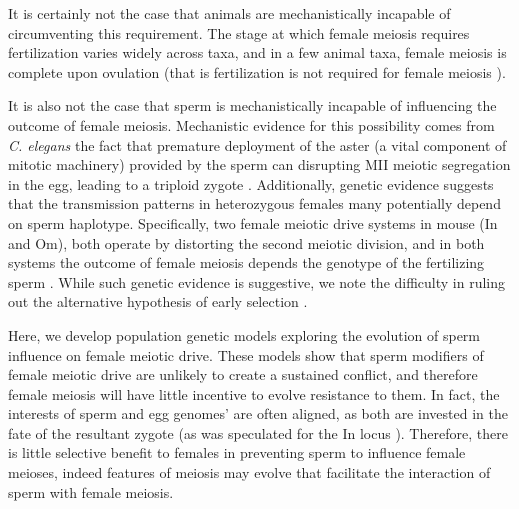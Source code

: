 \documentclass[12pt,letterpaper]{article}
\newcommand{\gc}[1]{{ \color{red} #1}}
\begin{document}
It is certainly not the case that animals are mechanistically incapable of circumventing this requirement.
The stage at which female meiosis requires fertilization varies widely across taxa, and in a few animal taxa, 
	female meiosis is complete upon ovulation (that is fertilization is not required for female meiosis \citep[see
	Table 1 of ][]{Masui_book}). 

It is also not the case that sperm is mechanistically incapable of influencing the outcome of female meiosis.
Mechanistic evidence for this possibility comes from
\emph{C. elegans} the fact that premature deployment of the aster (a vital component of mitotic
machinery) provided by the sperm can disrupting MII meiotic segregation
in the egg, leading to a triploid zygote \citep{McNally2012}. 
Additionally, genetic evidence suggests that the transmission patterns
in heterozygous females many potentially depend on sperm haplotype. 
Specifically, two female meiotic drive systems in mouse (In and Om), both operate by distorting the second meiotic division, 
and in both systems the outcome of female meiosis depends the genotype of the fertilizing sperm \citep{Agulnik1993,Wu2005}. 
While such genetic evidence is suggestive, we note the difficulty in
ruling out the alternative hypothesis of early selection  \citep[pages
52-54][]{Burt2006}.



Here, we develop population genetic models exploring the evolution of sperm influence on female meiotic drive. 
These models show that sperm modifiers of female meiotic drive are
unlikely to create a sustained conflict, and therefore 
female meiosis will have little incentive to evolve resistance to them.
In fact, the interests of sperm and egg  genomes' are often aligned, as both are invested in the fate of the resultant zygote (as was speculated for the In locus \citep{Pomiankowski1993}).
Therefore, there is little selective benefit to females in preventing sperm to influence female meioses,
	indeed features of meiosis may evolve that facilitate the interaction of sperm with female meiosis. 
\end{document}

